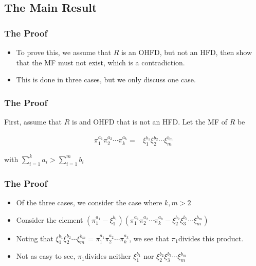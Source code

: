 \subsection{The Main Result}

\begin{frame}
  \frametitle{The Proof}
  \begin{itemize}
    \item To prove this, we assume that $R$ is an OHFD, but not an HFD, then show that the MF must not exist, which is a contradiction.
    \item This is done in three cases, but we only discuss one case.
  \end{itemize}
\end{frame}

\begin{frame}
  \frametitle{The Proof}

  First, assume that $R$ is and OHFD that is not an HFD. Let the MF of $R$ be 

  \begin{align*}
    \pi_{1}^{a_{1}}\pi_{2}^{a_{2}}\cdots\pi_{k}^{a_{k}}= & \xi_{1}^{b_{1}}\xi_{2}^{b_{2}}\cdots\xi_{m}^{b_{m}}
  \end{align*}

  with $\sum_{i=1}^{k}a_{i}>\sum_{i=1}^{m}b_{i}$
\end{frame}

\begin{frame}
  \frametitle{The Proof}
  \begin{itemize}
    \item Of the three cases, we consider the case where $k,m>2$
  \end{itemize}

  \pause{}
  \begin{itemize}
    \item Consider the element $(\pi_{1}^{a_{1}}-\xi_{1}^{b_{1}})(\pi_{1}^{a_{1}}\pi_{2}^{a_{2}}\cdots\pi_{k}^{a_{k}}-\xi_{2}^{b_{2}}\xi_{3}^{b_{3}}\cdots\xi_{m}^{b_{m}})$
  \end{itemize}

  \pause{}
  \begin{itemize}
    \item Noting that $\xi_{1}^{b_{1}}\xi_{2}^{b_{2}}\cdots\xi_{m}^{b_{m}}=\pi_{1}^{a_{1}}\pi_{2}^{a_{2}}\cdots\pi_{k}^{a_{k}}$, we see that $\pi_{1}$divides this product. 
  \end{itemize}

  \pause{}
  \begin{itemize}
    \item Not as easy to see, $\pi_{1}$divides neither $\xi_{1}^{b_{1}}$ nor
      $\xi_{2}^{b_{2}}\xi_{3}^{b_{3}}\cdots\xi_{m}^{b_{m}}$
  \end{itemize}
\end{frame}

